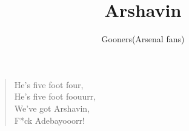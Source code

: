 \documentclass[a4paper,12pt]{article}
\title{Arshavin}
\author{Gooners(Arsenal fans)}
\date{}
\begin{document}
	
	\maketitle
	
	\begin{verse}
		
		He's five foot four, \\
		He's five foot foouurr, \\
		We've got Arshavin, \\
		F*ck Adebayooorr!
		
	\end{verse}
	
\end{document}
